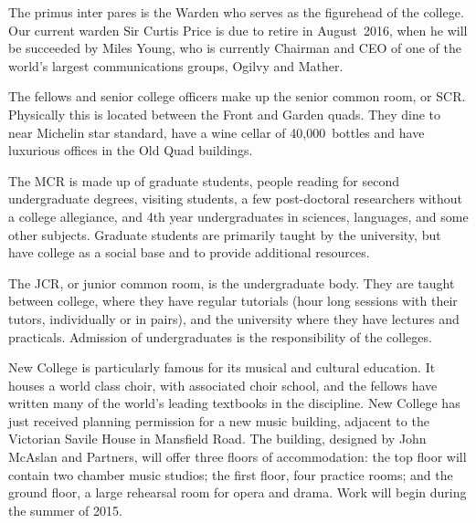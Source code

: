 The primus inter pares is the Warden who serves as the figurehead of the college. Our current warden Sir Curtis Price is due to retire in August~2016, when he will be succeeded by Miles Young, who is currently Chairman and CEO of one of the world's largest communications groups, Ogilvy and Mather.

The fellows and senior college officers make up the senior common room, or SCR. Physically this is located between the Front and Garden quads. They dine to near Michelin star standard, have a wine cellar of 40,000~bottles and have luxurious offices in the Old Quad buildings.

The MCR is made up of graduate students, people reading for second undergraduate degrees, visiting students, a few post-doctoral researchers without a college allegiance, and 4th year undergraduates in sciences, languages, and some other subjects. Graduate students are primarily taught by the university, but have college as a social base and to provide additional resources.

The JCR, or junior common room, is the undergraduate body. They are taught between college,
where they have regular tutorials (hour long sessions with their tutors, individually or in pairs), and the university where they have lectures and practicals. Admission of undergraduates is the responsibility of the colleges.

New College is particularly famous for its musical and cultural education. It houses a world class choir, with associated choir school, and the fellows have written many of the world's leading textbooks in the discipline. New College has just received planning permission for a new music building, adjacent to the Victorian Savile House in Mansfield Road. The building, designed by John McAslan and Partners, will offer three floors of accommodation: the top floor will contain two chamber music studios; the first floor, four practice rooms; and the ground floor, a large rehearsal room for opera and drama. Work will begin during the summer of 2015.
